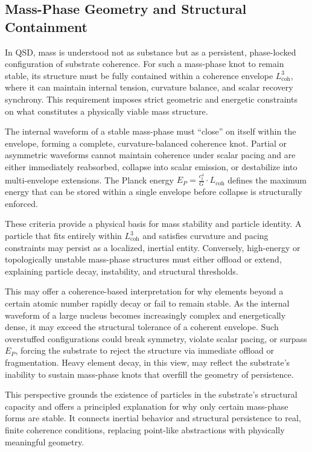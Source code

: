 \documentclass[entropy,article,submit,pdftex,moreauthors]{Definitions/mdpi}
\begin{document}
\subsection{Mass-Phase Geometry and Structural Containment}

In QSD, mass is understood not as substance but as a persistent, phase-locked configuration of substrate coherence. For such a mass-phase knot to remain stable, its structure must be fully contained within a coherence envelope \texorpdfstring{\( L_{\text{coh}}^3 \)}{Lcoh\^{}3}, where it can maintain internal tension, curvature balance, and scalar recovery synchrony. This requirement imposes strict geometric and energetic constraints on what constitutes a physically viable mass structure.

The internal waveform of a stable mass-phase must “close” on itself within the envelope, forming a complete, curvature-balanced coherence knot. Partial or asymmetric waveforms cannot maintain coherence under scalar pacing and are either immediately reabsorbed, collapse into scalar emission, or destabilize into multi-envelope extensions. The Planck energy \texorpdfstring{\( E_P = \frac{c_t^4}{G} \cdot L_{\text{coh}} \)}{Ep = (ct\^{}4 / G) * Lcoh} defines the maximum energy that can be stored within a single envelope before collapse is structurally enforced.

These criteria provide a physical basis for mass stability and particle identity. A particle that fits entirely within \texorpdfstring{\( L_{\text{coh}}^3 \)}{Lcoh\^{}3} and satisfies curvature and pacing constraints may persist as a localized, inertial entity. Conversely, high-energy or topologically unstable mass-phase structures must either offload or extend, explaining particle decay, instability, and structural thresholds.

This may offer a coherence-based interpretation for why elements beyond a certain atomic number rapidly decay or fail to remain stable. As the internal waveform of a large nucleus becomes increasingly complex and energetically dense, it may exceed the structural tolerance of a coherent envelope. Such overstuffed configurations could break symmetry, violate scalar pacing, or surpass \( E_P \), forcing the substrate to reject the structure via immediate offload or fragmentation. Heavy element decay, in this view, may reflect the substrate’s inability to sustain mass-phase knots that overfill the geometry of persistence.

This perspective grounds the existence of particles in the substrate’s structural capacity and offers a principled explanation for why only certain mass-phase forms are stable. It connects inertial behavior and structural persistence to real, finite coherence conditions, replacing point-like abstractions with physically meaningful geometry.
\end{document}
